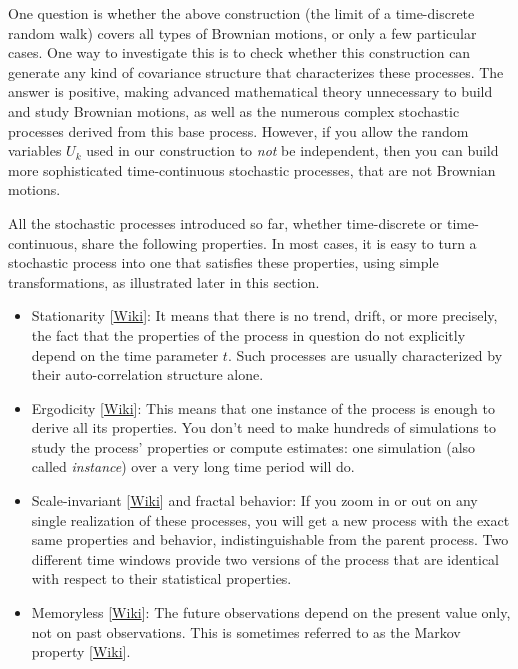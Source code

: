 \documentclass[oneside,10pt]{book}
\begin{document}
One question is whether the above construction (the limit of a time-discrete random walk) covers all types of Brownian motions, or only a few particular cases. One way to investigate this is to check whether this construction can generate any kind of covariance structure that characterizes these processes. The answer is positive, making advanced mathematical theory unnecessary to build and study Brownian motions, as well as the numerous complex stochastic processes derived from this base process.  However, if you allow the random variables $U_k$ used in our construction to {\em not} be independent, then you can build more sophisticated time-continuous stochastic processes, that are not Brownian motions. 


All the stochastic processes introduced so far, whether time-discrete or time-continuous, share the following properties. In most cases, it is easy to turn a stochastic process into one that satisfies these properties, using simple transformations, as illustrated later in this section.\vspace{1ex} 
\begin{itemize}
\item \textcolor{index}{Stationarity} [\href{https://en.wikipedia.org/wiki/Stationary_process}{Wiki}]: It means that there is no trend, drift, or more precisely, the fact that the properties of the process in question do not explicitly depend on the time parameter $t$. Such processes are usually characterized by their auto-correlation structure alone. 
\item \textcolor{index}{Ergodicity} [\href{https://en.wikipedia.org/wiki/Ergodicity}{Wiki}]: This means that one instance of the process is enough to derive all its properties. You don't need to make hundreds of simulations to study the process' properties or compute estimates: one simulation (also called {\em instance}) over a very long time period will do.  

\item \textcolor{index}{Scale-invariant} [\href{https://en.wikipedia.org/wiki/Scale_invariance}{Wiki}] and fractal behavior: If you zoom in or out on any single realization of these processes, you will get a new process with the exact same properties and behavior, indistinguishable from the parent process. Two different time windows provide two versions of the process that are identical with respect to their statistical properties. 

\item \textcolor{index}{Memoryless} [\href{https://en.wikipedia.org/wiki/Memorylessness}{Wiki}]: The future observations depend on the present value only, not on past observations. This is sometimes referred to as 
the \textcolor{index}{Markov property} [\href{https://en.wikipedia.org/wiki/Markov_property}{Wiki}].  
\end{itemize}\vspace{1ex}
\end{document}
